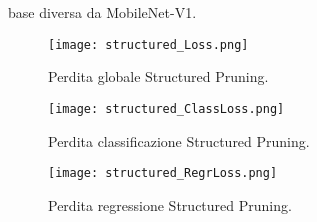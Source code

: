 base diversa da MobileNet-V1.
\begin{figure}
    \centering
    \hspace*{-1.5cm}
    \texttt{[image: structured\_Loss.png]}
    \centering
    \caption{Perdita globale Structured Pruning.}
    \label{struct_loss_global_pruning}
\end{figure}
\begin{figure}
    \centering
    \hspace*{-0.5cm}
    \texttt{[image: structured\_ClassLoss.png]}
    \centering
    \caption{Perdita classificazione Structured Pruning.}
    \label{struct_loss_class_pruning}
\end{figure}
\begin{figure}
    \centering
    \texttt{[image: structured\_RegrLoss.png]}
    \centering
    \caption{Perdita regressione Structured Pruning.}
    \label{struct_loss_regr_pruning}
\end{figure}

